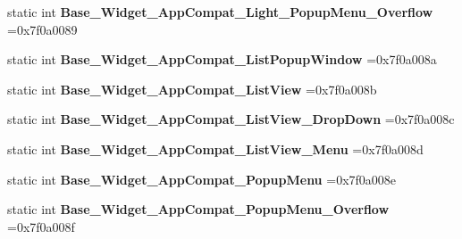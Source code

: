 \begin{DoxyCompactItemize}
static int {\bfseries Base\+\_\+\+Widget\+\_\+\+App\+Compat\+\_\+\+Light\+\_\+\+Popup\+Menu\+\_\+\+Overflow} =0x7f0a0089
\item 
\mbox{\label{classandroid_1_1support_1_1graphics_1_1drawable_1_1R_1_1style_aee9896c1149fb51227448dbb7c485d65}} 
static int {\bfseries Base\+\_\+\+Widget\+\_\+\+App\+Compat\+\_\+\+List\+Popup\+Window} =0x7f0a008a
\item 
\mbox{\label{classandroid_1_1support_1_1graphics_1_1drawable_1_1R_1_1style_a1818293f8c5a5aa83359eb6ec77e4e2d}} 
static int {\bfseries Base\+\_\+\+Widget\+\_\+\+App\+Compat\+\_\+\+List\+View} =0x7f0a008b
\item 
\mbox{\label{classandroid_1_1support_1_1graphics_1_1drawable_1_1R_1_1style_ac852a1921bfe2c9cfd4201c9a82713ea}} 
static int {\bfseries Base\+\_\+\+Widget\+\_\+\+App\+Compat\+\_\+\+List\+View\+\_\+\+Drop\+Down} =0x7f0a008c
\item 
\mbox{\label{classandroid_1_1support_1_1graphics_1_1drawable_1_1R_1_1style_a9fe934eb86f79b48a4fef8736610fdc3}} 
static int {\bfseries Base\+\_\+\+Widget\+\_\+\+App\+Compat\+\_\+\+List\+View\+\_\+\+Menu} =0x7f0a008d
\item 
\mbox{\label{classandroid_1_1support_1_1graphics_1_1drawable_1_1R_1_1style_a3260d499c63cb335ef3063bcab4783c2}} 
static int {\bfseries Base\+\_\+\+Widget\+\_\+\+App\+Compat\+\_\+\+Popup\+Menu} =0x7f0a008e
\item 
\mbox{\label{classandroid_1_1support_1_1graphics_1_1drawable_1_1R_1_1style_a3103ac863d6cf94aea4ec0e3341d3cc0}} 
static int {\bfseries Base\+\_\+\+Widget\+\_\+\+App\+Compat\+\_\+\+Popup\+Menu\+\_\+\+Overflow} =0x7f0a008f
\item 
\mbox{\label{classandroid_1_1support_1_1graphics_1_1drawable_1_1R_1_1style_a9e079d0d162038e9c4a6ab2379fe9a02}} 

\end{DoxyCompactItemize}
